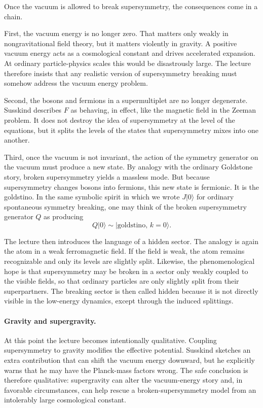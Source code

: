 Once the vacuum is allowed to break supersymmetry, the consequences come in a chain.

First, the vacuum energy is no longer zero. That matters only weakly in nongravitational field theory, but it matters violently in gravity. A positive vacuum energy acts as a cosmological constant and drives accelerated expansion. At ordinary particle-physics scales this would be disastrously large. The lecture therefore insists that any realistic version of supersymmetry breaking must somehow address the vacuum energy problem.

Second, the bosons and fermions in a supermultiplet are no longer degenerate. Susskind describes \(F\) as behaving, in effect, like the magnetic field in the Zeeman problem. It does not destroy the idea of supersymmetry at the level of the equations, but it splits the levels of the states that supersymmetry mixes into one another.

Third, once the vacuum is not invariant, the action of the symmetry generator on the vacuum must produce a new state. By analogy with the ordinary Goldstone story, broken supersymmetry yields a massless mode. But because supersymmetry changes bosons into fermions, this new state is fermionic. It is the goldstino. In the same symbolic spirit in which we wrote \(J|0\rangle\) for ordinary spontaneous symmetry breaking, one may think of the broken supersymmetry generator \(Q\) as producing
\begin{equation}
Q|0\rangle \sim |\text{goldstino},\,k=0\rangle.
\end{equation}

The lecture then introduces the language of a hidden sector. The analogy is again the atom in a weak ferromagnetic field. If the field is weak, the atom remains recognizable and only its levels are slightly split. Likewise, the phenomenological hope is that supersymmetry may be broken in a sector only weakly coupled to the visible fields, so that ordinary particles are only slightly split from their superpartners. The breaking sector is then called hidden because it is not directly visible in the low-energy dynamics, except through the induced splittings.

\paragraph{Gravity and supergravity.}
At this point the lecture becomes intentionally qualitative. Coupling supersymmetry to gravity modifies the effective potential. Susskind sketches an extra contribution that can shift the vacuum energy downward, but he explicitly warns that he may have the Planck-mass factors wrong. The safe conclusion is therefore qualitative: supergravity can alter the vacuum-energy story and, in favorable circumstances, can help rescue a broken-supersymmetry model from an intolerably large cosmological constant.

